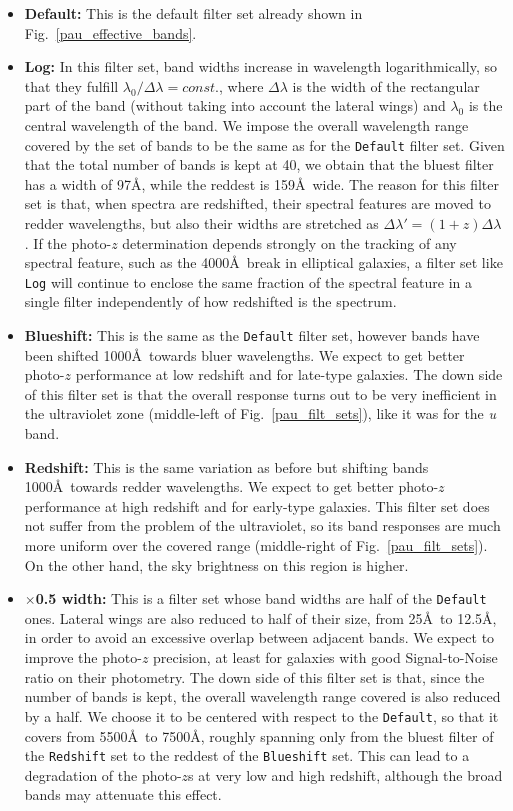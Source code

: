 \begin{itemize}
\item \textbf{Default:} This is the default filter set already shown in Fig.~\ref{pau_effective_bands}. 
\item \textbf{Log:} In this filter set, band widths increase in wavelength logarithmically, so that they fulfill $\lambda_0 / \Delta \lambda=const.$, where $\Delta \lambda$ is the width of the rectangular part of the band (without taking into account the lateral wings) and $\lambda_0$ is the central wavelength of the band. We impose the overall wavelength range covered by the set of bands to be the same as for the \texttt{Default} filter set. Given that the total number of bands is kept at 40, we obtain that the bluest filter has a width of 97\AA, while the reddest is 159\AA \ wide. The reason for this filter set is that, when spectra are redshifted, their spectral features are moved to redder wavelengths, but also their widths are stretched as $\Delta \lambda ' = (1+z) \Delta \lambda$. If the photo-$z$ determination depends strongly on the tracking of any spectral feature, such as the 4000\AA \ break in elliptical galaxies, a filter set like \texttt{Log} will continue to enclose the same fraction of the spectral feature in a single filter independently of how redshifted is the spectrum.
\item \textbf{Blueshift:} This is the same as the \texttt{Default} filter set, however bands have been shifted 1000\AA \ towards bluer wavelengths. We expect to get better photo-$z$ performance at low redshift and for late-type galaxies. The down side of this filter set is that the overall response turns out to be very inefficient in the ultraviolet zone (middle-left of Fig.~\ref{pau_filt_sets}), like it was for the \textit{u} band.
\item \textbf{Redshift:} This is the same variation as before but shifting bands 1000\AA \ towards redder wavelengths. We expect to get better photo-$z$ performance at high redshift and for early-type galaxies. This filter set does not suffer from the problem of the ultraviolet, so its band responses are much more uniform over the covered range (middle-right of Fig.~\ref{pau_filt_sets}). On the other hand, the sky brightness on this region is higher.
\item \textbf{$\times$0.5 width:} This is a filter set whose band widths are half of the \texttt{Default} ones. Lateral wings are also reduced to half of their size, from 25\AA \ to 12.5\AA, in order to avoid an excessive overlap between adjacent bands. We expect to improve the photo-$z$ precision, at least for galaxies with good Signal-to-Noise ratio on their photometry. The down side of this filter set is that, since the number of bands is kept, the overall wavelength range covered is also reduced by a half. We choose it to be centered with respect to the \texttt{Default}, so that it covers from 5500\AA \ to 7500\AA, roughly spanning only from the bluest filter of the \texttt{Redshift} set to the reddest of the \texttt{Blueshift} set. This can lead to a degradation of the photo-$z$s at very low and high redshift, although the broad bands may attenuate this effect.

\end{itemize}
